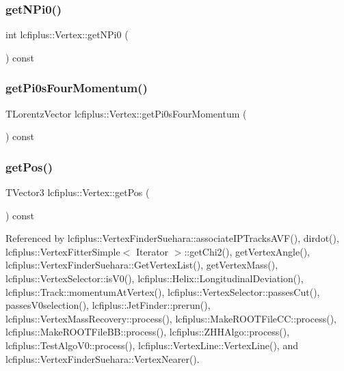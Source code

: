 \subsubsection{get\+N\+Pi0()}
{\footnotesize\ttfamily int lcfiplus\+::\+Vertex\+::get\+N\+Pi0 (\begin{DoxyParamCaption}{ }\end{DoxyParamCaption}) const\hspace{0.3cm}{\ttfamily [inline]}}

\mbox{\label{classlcfiplus_1_1Vertex_a2e59ecb9f38d5404b2a8352c83443287}} 
\subsubsection{get\+Pi0s\+Four\+Momentum()}
{\footnotesize\ttfamily T\+Lorentz\+Vector lcfiplus\+::\+Vertex\+::get\+Pi0s\+Four\+Momentum (\begin{DoxyParamCaption}{ }\end{DoxyParamCaption}) const\hspace{0.3cm}{\ttfamily [inline]}}

\mbox{\label{classlcfiplus_1_1Vertex_ac5733ddab0e423928e900d45c25f7924}} 
\subsubsection{get\+Pos()}
{\footnotesize\ttfamily T\+Vector3 lcfiplus\+::\+Vertex\+::get\+Pos (\begin{DoxyParamCaption}{ }\end{DoxyParamCaption}) const\hspace{0.3cm}{\ttfamily [inline]}}



Referenced by lcfiplus\+::\+Vertex\+Finder\+Suehara\+::associate\+I\+P\+Tracks\+A\+V\+F(), dirdot(), lcfiplus\+::\+Vertex\+Fitter\+Simple$<$ Iterator $>$\+::get\+Chi2(), get\+Vertex\+Angle(), lcfiplus\+::\+Vertex\+Finder\+Suehara\+::\+Get\+Vertex\+List(), get\+Vertex\+Mass(), lcfiplus\+::\+Vertex\+Selector\+::is\+V0(), lcfiplus\+::\+Helix\+::\+Longitudinal\+Deviation(), lcfiplus\+::\+Track\+::momentum\+At\+Vertex(), lcfiplus\+::\+Vertex\+Selector\+::passes\+Cut(), passes\+V0selection(), lcfiplus\+::\+Jet\+Finder\+::prerun(), lcfiplus\+::\+Vertex\+Mass\+Recovery\+::process(), lcfiplus\+::\+Make\+R\+O\+O\+T\+File\+C\+C\+::process(), lcfiplus\+::\+Make\+R\+O\+O\+T\+File\+B\+B\+::process(), lcfiplus\+::\+Z\+H\+H\+Algo\+::process(), lcfiplus\+::\+Test\+Algo\+V0\+::process(), lcfiplus\+::\+Vertex\+Line\+::\+Vertex\+Line(), and lcfiplus\+::\+Vertex\+Finder\+Suehara\+::\+Vertex\+Nearer().

